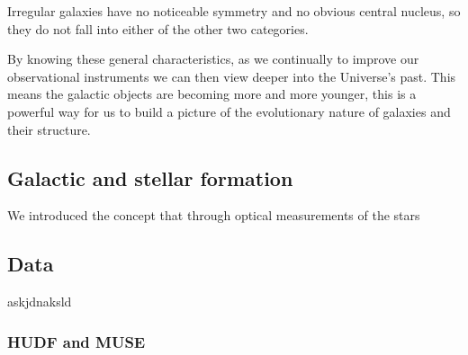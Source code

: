 \documentclass[12pt, twocolumn]{revtex4}    %
\begin{document}
Irregular galaxies have no noticeable symmetry and no obvious central nucleus, so they do not fall into either of the other two categories.





By knowing these general characteristics, as we continually to improve our observational instruments we can then view deeper into the Universe's past. This means the galactic objects are becoming more and more younger, this is a powerful way for us to build a picture of the evolutionary nature of galaxies and their structure. 

\subsection{Galactic and stellar formation}


We introduced the concept that through optical measurements of the stars 


\subsection{Data} 

askjdnaksld

\subsubsection{HUDF and MUSE}
\end{document}

